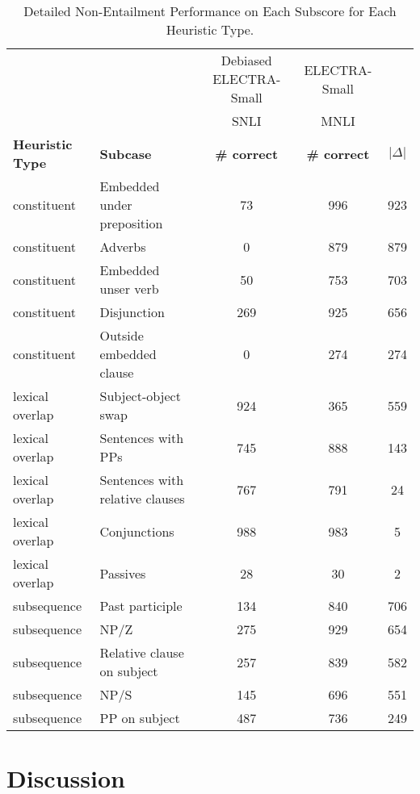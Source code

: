\documentclass[11pt,a4paper]{article}
\begin{document}
\begin{table*}[th]
\begin{center}
\begin{tabular}{llccc}
\hline 
& & Debiased ELECTRA-Small & ELECTRA-Small 
\\
& & SNLI & MNLI 
\\
\textbf{Heuristic Type} & \textbf{Subcase} & \textbf{\# correct}& \textbf{\# correct} & $|\Delta|$ \\ \hline
constituent & Embedded under preposition & 73 & 996 & 923 \\constituent & Adverbs & 0 & 879 & 879 \\constituent & Embedded unser verb & 50 & 753 & 703 \\constituent & Disjunction & 269 & 925 & 656 \\constituent & Outside embedded clause & 0 & 274 & 274 \\lexical overlap & Subject-object swap & 924 & 365 & 559 \\lexical overlap & Sentences with PPs & 745 & 888 & 143 \\lexical overlap & Sentences with relative clauses & 767 & 791 & 24 \\lexical overlap & Conjunctions & 988 & 983 & 5 \\lexical overlap & Passives & 28 & 30 & 2 \\subsequence & Past participle & 134 & 840 & 706 \\subsequence & NP/Z & 275 & 929 & 654 \\subsequence & Relative clause on subject & 257 & 839 & 582 \\subsequence & NP/S & 145 & 696 & 551 \\subsequence & PP on subject & 487 & 736 & 249 \\
\hline
\end{tabular}
\end{center}
\caption{Detailed Non-Entailment Performance on Each Subscore for Each Heuristic Type.}
\label{table: detailed-HANS-types}
\end{table*}

\section{Discussion}
\end{document}
